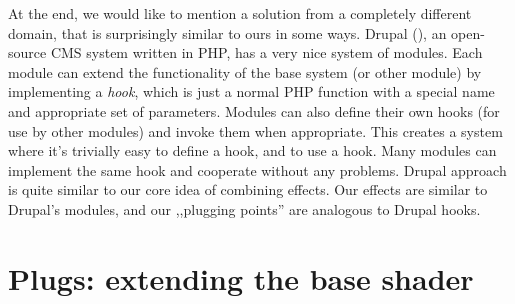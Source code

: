 \documentclass{egpubl}
\begin{document}
At the end, we would like to mention a solution from a completely
different domain, that is surprisingly similar to ours in some ways.
Drupal (),
an open-source CMS system written in PHP,
has a very nice system of modules. Each module
can extend the functionality of the base system (or other module)
by implementing a \textit{hook}, which is just a normal PHP function
with a special name and appropriate set of parameters. Modules can also define
their own hooks (for use by other modules) and invoke them when appropriate.
This creates a system where it's trivially easy to define a hook,
and to use a hook.
Many modules can implement the same hook and cooperate without any problems.
Drupal approach is quite similar to our
core idea of combining effects. Our effects are similar to
Drupal's modules, and our ,,plugging points'' are analogous to Drupal hooks.


%
%

\section{Plugs: extending the base shader}
\end{document}
